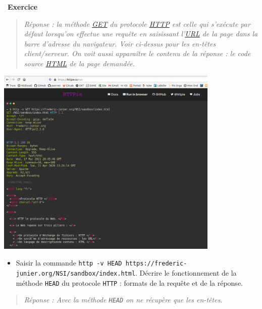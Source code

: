 \documentclass[
  11pt,
]{article}
\newcommand{\passthrough}[1]{#1}
\providecommand{\tightlist}{%
  \setlength{\itemsep}{0pt}\setlength{\parskip}{0pt}}
\newcounter{exo}
\newenvironment{exercice}[1]
{\par \medskip   \addtocounter{exo}{1} \noindent  
\begin{bclogo}[arrondi =0.1,   noborder = true, logo=\bccrayon, marge=4]{~\textbf{Exercice} \textbf{\theexo} {\itshape #1} }  \par}
{
\end{bclogo}
 \par \bigskip }
\begin{document}
\begin{exercice}{}
\begin{enumerate}
  \begin{quote}
  \emph{Réponse : la méthode \url{GET} du protocole \url{HTTP} est celle
  qui s'exécute par défaut lorsqu'on effectue une requête en saisissant
  l'\url{URL} de la page dans la barre d'adresse du navigateur. Voir
  ci-dessus pour les en-têtes client/serveur. On voit aussi apparaître
  le contenu de la réponse : le code source \url{HTML} de la page
  demandée.}
  \end{quote}

  \includegraphics[width=0.8\textwidth,height=\textheight]{images/http_pie1.png}\\

  \begin{itemize}
  \tightlist
  \item
    Saisir la commande
    \passthrough{\lstinline!http -v HEAD https://frederic-junier.org/NSI/sandbox/index.html!}.
    Décrire le fonctionnement de la méthode
    \passthrough{\lstinline!HEAD!} du protocole
    \passthrough{\lstinline!HTTP!} : formats de la requête et de la
    réponse.
  \end{itemize}

  \begin{quote}
  \emph{Réponse : Avec la méthode \passthrough{\lstinline!HEAD!} on ne
  récupère que les en-têtes.}
  \end{quote}


\end{enumerate}
\end{exercice}
\end{document}
